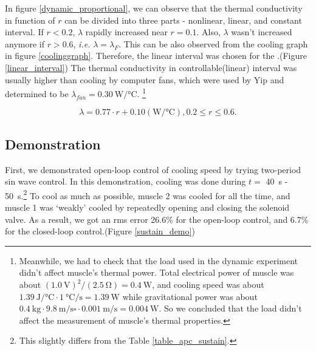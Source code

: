 In figure \ref{dynamic_proportional}, we can observe that the thermal conductivity in function of $r$ can be divided into three parts - nonlinear, linear, and constant interval. If $r<0.2$, $\lambda$ rapidly increased near $r=0.1$. Also, $\lambda$ wasn't increased anymore if $r>0.6$, {\it i.e.} $\lambda = \lambda_{F}$. This can be also observed from the cooling graph in figure \ref{coolinggraph}.
Therefore, the linear interval was chosen for the \Apcnospace.(Figure \ref{linear_interval}) The thermal conductivity in controllable(linear) interval was usually higher than cooling by computer fans, which were used by Yip \etalspace \cite{yip} and determined to be $\lambda_{fan}=\SI{0.30}{\watt\per\degreeCelsius}$.
\footnote{
	Meanwhile, we had to check that the load used in the dynamic experiment didn't affect muscle's thermal power. 
	Total electrical power of muscle was about $(\SI{1.0}{\volt})^2/(\SI{2.5}{\ohm})=\SI{0.4}{\watt}$, and cooling speed was about $\SI{1.39}{\joule\per\degreeCelsius} \cdot \SI{1}{\degreeCelsius\per\second}=\SI{1.39}{\watt}$ while gravitational power was about  $\SI{0.4}{\kilo\gram} \cdot  \SI{9.8}{\meter\per\second\square} \cdot \SI{0.001}{\meter\per\second}=\SI{0.004}{\watt}$. So we concluded that the load didn't affect the measurement of muscle's thermal properties.
}

\begin{equation} \label{lambda_control}
\lambda = 0.77\cdot r + 0.10 (\si{\watt\per\degreeCelsius}), 0.2\leq r \leq 0.6.
\end{equation}



\subsection{\APC Demonstration}

First, we demonstrated open-loop control of cooling speed by trying two-period sin wave control. In this demonstration, cooling was done during $t=$ \SI{40}{\second} - \SI{50}{\second}.\footnote{This slightly differs from the Table \ref{table_apc_sustain}.} To cool as much as possible, muscle 2 was cooled for all the time, and muscle 1 was `weakly' cooled by repeatedly opening and closing the solenoid valve. As a result, we got an rms error 26.6\% for the open-loop control, and 6.7\% for the closed-loop control.(Figure \ref{sustain_demo})

